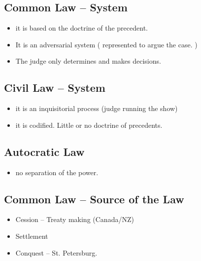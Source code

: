 \subsection*{Common Law -- System}
\begin{itemize}
    \item it is based on the doctrine of the precedent. 
    \item It is an adversarial system ( represented to argue the case. )
    \item The judge only determines and makes decisions.
\end{itemize}


\subsection{Civil Law -- System}
\begin{itemize}
    \item it is an inquisitorial process (judge running the show)
    \item it is codified. Little or no doctrine of precedents. 
\end{itemize}

\subsection{Autocratic Law}
\begin{itemize}
    \item no separation of the power. 
\end{itemize}

\subsection*{Common Law -- Source of the Law}

\begin{itemize}
    \item Cession -- Treaty making (Canada/NZ)
    \item Settlement
    \item Conquest -- St. Petersburg.
\end{itemize}


